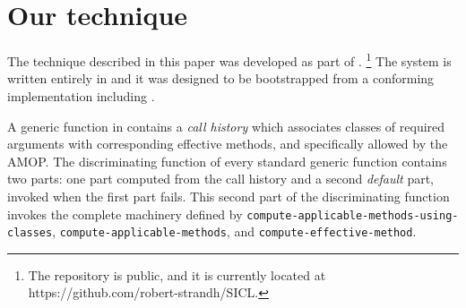 \section{Our technique}

The technique described in this paper was developed as part of
\sicl{}.%
\footnote{The \sicl{} repository is public, and it is currently
  located at https://github.com/robert-strandh/SICL.}  The system is
written entirely in \cl{} and it was designed to be bootstrapped 
from a conforming \cl{} implementation including \clos{}.  

A generic function in \sicl{} contains a \emph{call history} which
associates classes of required arguments with corresponding effective
methods, and specifically allowed by the AMOP.  The discriminating
function of every standard generic function contains two parts: one
part computed from the call history and a second \emph{default} part,
invoked when the first part fails.  This second part of the
discriminating function invokes the complete machinery defined by
\texttt{compute-applicable-methods-using-classes},
\texttt{compute-applicable-methods}, and
\texttt{compute-effective-method}.
